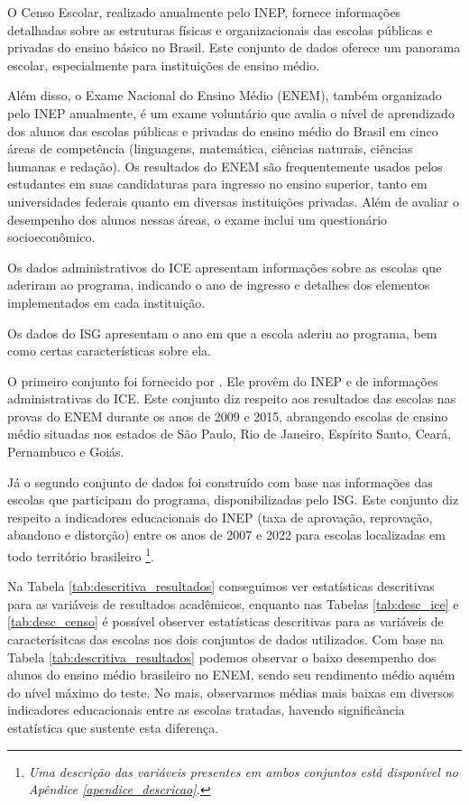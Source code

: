 O Censo Escolar, realizado anualmente pelo INEP, fornece informações detalhadas sobre as estruturas físicas e organizacionais das escolas públicas e privadas do ensino básico no Brasil. Este conjunto de dados oferece um panorama escolar, especialmente para instituições de ensino médio.

Além disso, o Exame Nacional do Ensino Médio (ENEM), também organizado pelo INEP anualmente, é um exame voluntário que avalia o nível de aprendizado dos alunos das escolas públicas e privadas do ensino médio do Brasil em cinco áreas de competência (linguagens, matemática, ciências naturais, ciências humanas e redação). Os resultados do ENEM são frequentemente usados pelos estudantes em suas candidaturas para ingresso no ensino superior, tanto em universidades federais quanto em diversas instituições privadas. Além de avaliar o desempenho dos alunos nessas áreas, o exame inclui um questionário socioeconômico.

Os dados administrativos do ICE apresentam informações sobre as escolas que aderiram ao programa, indicando o ano de ingresso e detalhes dos elementos implementados em cada instituição. 

Os dados do ISG apresentam o ano em que a escola aderiu ao programa, bem como certas características sobre ela.

O primeiro conjunto foi fornecido por \cite{Kawahara_2019}. Ele provêm do INEP e de informações administrativas do ICE. Este conjunto diz respeito aos resultados das escolas nas provas do ENEM  durante os anos de 2009 e 2015, abrangendo escolas de ensino médio situadas nos estados de São Paulo, Rio de Janeiro, Espírito Santo, Ceará, Pernambuco e Goiás. 

Já o segundo conjunto de dados foi construído com base nas informações das escolas que participam do programa, disponibilizadas pelo ISG. Este conjunto diz respeito a indicadores educacionais do INEP (taxa de aprovação, reprovação, abandono e distorção) entre os anos de 2007 e 2022 para escolas localizadas em todo território brasileiro \footnote[1]{\textit{Uma descrição das variáveis presentes em ambos conjuntos está disponível no Apêndice \ref{apendice_descricao}.}}.

Na Tabela \ref{tab:descritiva_resultados} conseguimos ver estatísticas descritivas para as variáveis de resultados acadêmicos, enquanto nas Tabelas \ref{tab:desc_ice} e \ref{tab:desc_censo} é possível observer estatísticas descritivas para as variáveis de caracterísitcas das escolas nos dois conjuntos de dados utilizados. Com base na Tabela \ref{tab:descritiva_resultados} podemos observar o baixo desempenho dos alunos do ensino médio brasileiro no ENEM, sendo seu rendimento médio aquém do nível máximo do teste. No mais, observarmos médias mais baixas em diversos indicadores educacionais entre as escolas tratadas, havendo significância estatística que sustente esta diferença.

